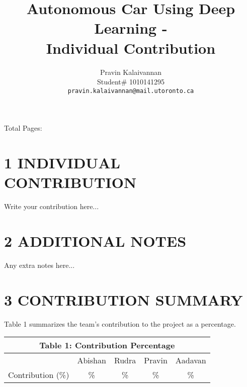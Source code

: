 \documentclass{article} %
\title{Autonomous Car Using Deep Learning - \\Individual Contribution}
\author{Pravin Kalaivannan  \\
Student\# 1010141295\\
\texttt{pravin.kalaivannan@mail.utoronto.ca} \\
}
\begin{document}
\maketitle

Total Pages: \pageref{last_page}

\maketitle

\section*{1 \hspace{2pt} INDIVIDUAL CONTRIBUTION}
Write your contribution here...

\section*{2 \hspace{2pt} ADDITIONAL NOTES}
Any extra notes here...

\section*{3 \hspace{2pt} CONTRIBUTION SUMMARY}
Table 1 summarizes the team's contribution to the project as a percentage.

\begin{center}
    \small
    \setlength{\tabcolsep}{8pt}
    \renewcommand{\arraystretch}{1.05}
    \begin{tabular}{lcccc}
        \multicolumn{5}{c}{\textbf{Table 1: Contribution Percentage}} \\
        \toprule
                          & Abishan & Rudra & Pravin & Aadavan        \\
        \midrule
        Contribution (\%) & \%      & \%    & \%     & \%             \\
        \bottomrule
    \end{tabular}
    \label{tab:contrib}
\end{center}

\label{last_page}



\end{document}
